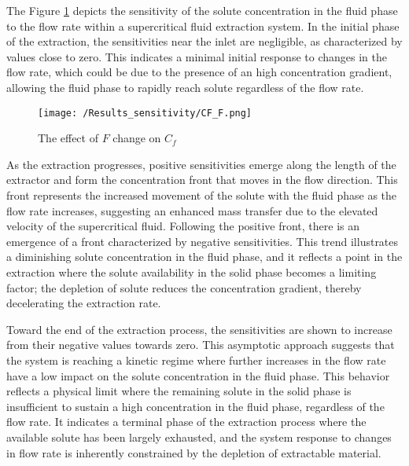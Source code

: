 \documentclass[../Article_Sensitivity_Analsysis.tex]{subfiles}
\begin{document}
	The Figure \ref{fig:Sensitivty_F_CF} depicts the sensitivity of the solute concentration in the fluid phase to the flow rate within a supercritical fluid extraction system. In the initial phase of the extraction, the sensitivities near the inlet are negligible, as characterized by values close to zero. This indicates a minimal initial response to changes in the flow rate, which could be due to the presence of an high concentration gradient, allowing the fluid phase to rapidly reach solute regardless of the flow rate.
	
	\begin{figure}[h!]
		\centering
		\texttt{[image: /Results\_sensitivity/CF\_F.png]}
		\caption{The effect of $F$ change on $C_f$}
		\label{fig:Sensitivty_F_CF}
	\end{figure}
	
	As the extraction progresses, positive sensitivities emerge along the length of the extractor and form the concentration front that moves in the flow direction. This front represents the increased movement of the solute with the fluid phase as the flow rate increases, suggesting an enhanced mass transfer due to the elevated velocity of the supercritical fluid. Following the positive front, there is an emergence of a front characterized by negative sensitivities. This trend illustrates a diminishing solute concentration in the fluid phase, and it reflects a point in the extraction where the solute availability in the solid phase becomes a limiting factor; the depletion of solute reduces the concentration gradient, thereby decelerating the extraction rate. 
	
	Toward the end of the extraction process, the sensitivities are shown to increase from their negative values towards zero. This asymptotic approach suggests that the system is reaching a kinetic regime where further increases in the flow rate have a low impact on the solute concentration in the fluid phase. This behavior reflects a physical limit where the remaining solute in the solid phase is insufficient to sustain a high concentration in the fluid phase, regardless of the flow rate. It indicates a terminal phase of the extraction process where the available solute has been largely exhausted, and the system response to changes in flow rate is inherently constrained by the depletion of extractable material.
	
\end{document}
